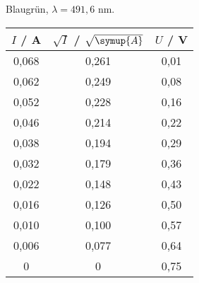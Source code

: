 \begin{subtable}{0.4\textwidth}
    \centering
    \caption{Blaugrün, $\lambda = 491,6$ nm.} 
    
        \begin{tabular}{c c c}
        
            \toprule
            { $I$ / A} & {$\sqrt{I}$ / $\sqrt{\symup{A}}$} & {$U$ / V} \\
            \midrule
                0,068 & 0,261 & 0,01 \\
                0,062 & 0,249 & 0,08 \\
                0,052 & 0,228 & 0,16 \\
                0,046 & 0,214 & 0,22 \\
                0,038 & 0,194 & 0,29 \\
                0,032 & 0,179 & 0,36 \\
                0,022 & 0,148 & 0,43 \\
                0,016 & 0,126 & 0,50 \\
                0,010 & 0,100 & 0,57 \\
                0,006 & 0,077 & 0,64 \\
                0     & 0 & 0,75 \\
            \bottomrule
        \end{tabular}
        
\end{subtable}